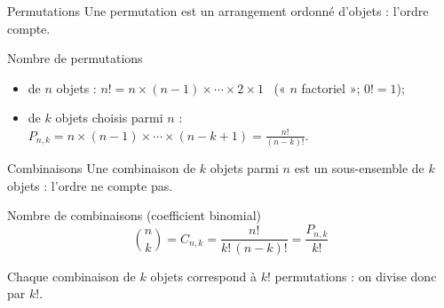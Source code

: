 \documentclass{BeamerTemplate}
\begin{document}
\begin{frame}[t]{Permutations}
  Une \alert{permutation} est un arrangement \alert{ordonné} d'objets :
  l'ordre compte.

  \begin{Boite}{Nombre de permutations}
    \begin{itemize}
      \item de $n$ objets : $n! = n \times (n-1) \times \cdots \times 2 \times 1$
        \ (« $n$ factoriel »; $0! = 1$);
      \item de $k$ objets choisis parmi $n$ :
        $\displaystyle P_{n,k} = n \times (n-1) \times \cdots \times (n-k+1)
        = \frac{n!}{(n-k)!}$.
    \end{itemize}
  \end{Boite}

\end{frame}

\begin{frame}[t]{Combinaisons}
  Une \alert{combinaison} de $k$ objets parmi $n$ est un sous-ensemble de $k$
  objets : l'ordre \alert{ne compte pas}.

  \begin{Boite}{Nombre de combinaisons (coefficient binomial)}
    \[ \binom{n}{k} = C_{n,k} = \frac{n!}{k!\,(n-k)!} = \frac{P_{n,k}}{k!} \]
  \end{Boite}
  {\small Chaque combinaison de $k$ objets correspond à $k!$ permutations :
  on divise donc par $k!$.}

\end{frame}
\end{document}
